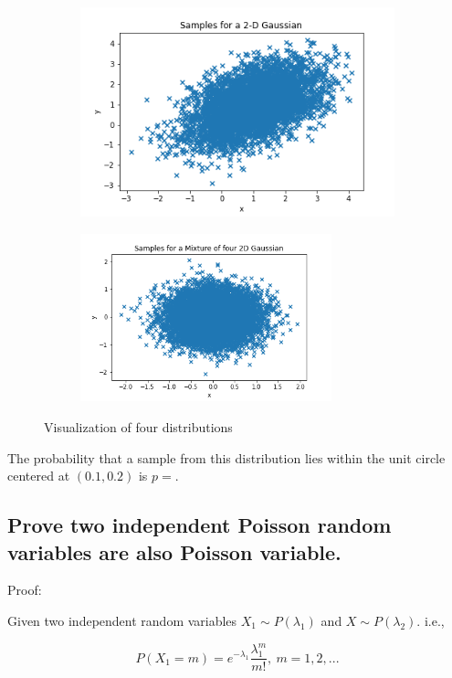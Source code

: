 \documentclass[english,11pt]{article}
\begin{document}
\begin{figure}[h]
\begin{subfigure}{.5\textwidth}
\centering
\includegraphics[width=.8\linewidth]{samplefigs/fig3.png}
\end{subfigure}%
\begin{subfigure}{.5\textwidth}
\centering
\includegraphics[width=0.8\textwidth]{samplefigs/fig4.png}
\end{subfigure}
\caption{Visualization of four distributions}
\end{figure}

The probability that a sample from this distribution lies within the unit circle centered at $(0.1, 0.2)$ is $p = $.


\subsection{Prove two independent Poisson random variables are also Poisson variable.}

Proof:

Given two independent random variables $X_{1}\sim P(\lambda_{1})$
and $X\sim P(\lambda_{2})$. i.e.,

\begin{equation}
P(X_{1}=m)=e^{-\lambda_{1}}\frac{\lambda_{1}^{m}}{m!},\ m=1,2,...    
\end{equation}
\end{document}
